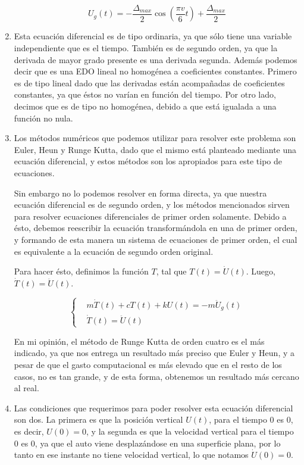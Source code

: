 \documentclass[10.5pt]{article}
\begin{document}
\begin{enumerate}
\[U_g(t) = -\frac{\Delta_{max}}{2}  \cos (\frac{\pi v}{6}t) + \frac{\Delta_{max}}{2} \]

 \item Esta ecuación diferencial es de tipo ordinaria, ya que sólo tiene una variable 
independiente que es el tiempo. También es de segundo orden, ya que la derivada de mayor
grado presente es una derivada segunda.
Además podemos decir que es una EDO lineal no homogénea a coeficientes constantes. Primero es de tipo lineal dado que las derivadas están
acompañadas de coeficientes constantes, ya que éstos no varían en función del tiempo. Por otro lado, decimos que es de tipo no homogénea,
debido a que está igualada a una función no nula.

 \item Los métodos numéricos que podemos utilizar para resolver este problema son Euler, Heun
y Runge Kutta, dado que el mismo está planteado mediante una ecuación diferencial, y estos
métodos son los apropiados para este tipo de ecuaciones.

Sin embargo no lo podemos resolver en forma directa, ya que nuestra ecuación diferencial es de segundo orden, y los métodos
mencionados sirven para resolver ecuaciones diferenciales de primer orden solamente. Debido a ésto, debemos reescribir la ecuación
transformándola en una de primer orden, y formando de esta manera un sistema de ecuaciones de primer orden, el cual es equivalente a la
ecuación de segundo orden original.

Para hacer ésto, definimos la función $T$, tal que $T(t) = \dot U(t)$. Luego, $\dot T(t) = \ddot U(t)$.

\[
\begin{cases}
  &m \dot T(t) + c T(t) + k U(t) = -m \ddot U_g(t) \\
  &\dot T(t) = \ddot U(t)
\end{cases}
\]

En mi opinión, el método de Runge Kutta de orden cuatro es el más indicado, ya que nos entrega un resultado más preciso que Euler y Heun, 
y a pesar de que el gasto computacional es más elevado que en el resto de los casos, no es tan grande, y de esta forma, obtenemos un resultado
más cercano al real.

 \item Las condiciones que requerimos para poder resolver esta ecuación diferencial son dos.
La primera es que la posición vertical $U(t)$, para el tiempo $0$ es $0$, es decir, $U(0) = 0$, y la segunda es que
la velocidad vertical para el tiempo $0$ es $0$, ya que el auto viene desplazándose en una
superficie plana, por lo tanto en ese instante no tiene velocidad vertical, lo que notamos $\dot U(0) = 0$.


\end{enumerate}
\end{document}
